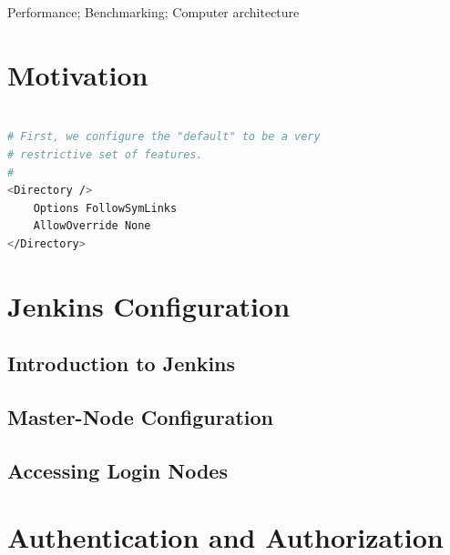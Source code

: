 \documentclass[10pt, conference, compsocconf]{IEEEtran}
\begin{document}
\begin{IEEEkeywords}
Performance; Benchmarking; Computer architecture
\end{IEEEkeywords}


%
\IEEEpeerreviewmaketitle

\section{Motivation}


\begin{lstlisting}[float,frame=tb,captionpos=t,language=bash,caption={Apache Configuration Example}, label=lst:apacheconfig]

# First, we configure the "default" to be a very 
# restrictive set of features.  
#
<Directory />
    Options FollowSymLinks
    AllowOverride None  
</Directory>

\end{lstlisting}

\section{Jenkins Configuration}
\label{sec:JenkinsConfiguration}

\subsection{Introduction to Jenkins}
\subsection{Master-Node Configuration}
\subsection{Accessing Login Nodes}


\section{Authentication and Authorization}
\label{sec:AuthenticationAuthorization}
\end{document}
